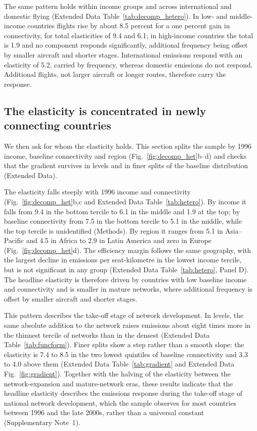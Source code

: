 \documentclass[12pt]{extarticle}
\begin{document}
The same pattern holds within income groups and across international and
domestic flying (Extended Data Table~\ref{tab:decomp_hetero}). In low-
and middle-income countries flights rise by about 8.5 percent for a one
percent gain in connectivity, for total elasticities of 9.4 and 6.1; in
high-income countries the total is 1.9 and no component responds
significantly, additional frequency being offset by smaller aircraft and
shorter stages. International emissions respond with an elasticity of
5.2, carried by frequency, whereas domestic emissions do not respond.
Additional flights, not larger aircraft or longer routes, therefore carry
the response.

\subsection*{The elasticity is concentrated in newly connecting countries}
We then ask for whom the elasticity holds. This section splits the sample
by 1996 income, baseline connectivity and region (Fig.~\ref{fig:decomp_het}b--d)
and checks that the gradient survives in levels and in finer splits of the
baseline distribution (Extended Data).

The elasticity falls steeply with 1996 income and connectivity
(Fig.~\ref{fig:decomp_het}b,c and Extended Data Table~\ref{tab:hetero}). By
income it falls from 9.4 in the bottom tercile to 6.1 in the middle and
1.9 at the top; by baseline connectivity from 7.5 in the bottom tercile
to 5.1 in the middle, while the top tercile is unidentified (Methods). By
region it ranges from 5.1 in Asia--Pacific and 4.5 in Africa to 2.9 in
Latin America and zero in Europe (Fig.~\ref{fig:decomp_het}d). The efficiency margin follows the same
geography, with the largest decline in emissions per seat-kilometre in
the lowest income tercile, but is not significant in any group
(Extended Data Table~\ref{tab:hetero}, Panel D). The
headline elasticity is therefore driven by countries with low baseline
income and connectivity and is smaller in mature networks, where
additional frequency is offset by smaller aircraft and shorter stages.

This pattern describes the take-off stage of network development. In levels, the same absolute addition to the network raises emissions about eight times more in the thinnest tercile of networks than in the densest (Extended Data Table~\ref{tab:funcform}). Finer splits show a step rather than a smooth
slope: the elasticity is 7.4 to 8.5 in the two lowest quintiles of
baseline connectivity and 3.3 to 4.0 above them (Extended Data
Table~\ref{tab:gradient} and Extended Data Fig.~\ref{fig:gradient}).
Together with the halving of the elasticity between the
network-expansion and mature-network eras, these results indicate that
the headline elasticity describes the emissions response during the
take-off stage of national network development, which the sample observes
for most countries between 1996 and the late 2000s, rather than a
universal constant (Supplementary Note~1).
\end{document}
